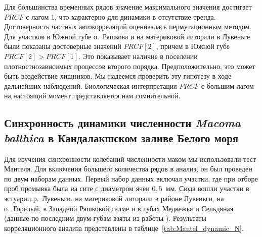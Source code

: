Для большинства временных рядов значение максимального значения достигает $PRCF$ с лагом 1, что характерно для динамики в отсутствие тренда. 
Достоверность частных автокорреляций оценивалась пермутационным методом.
Для участков в Южной губе о.~Ряшкова и на материковой литорали в Лувеньге были показаны достоверные значений $PRCF[2]$, причем в Южной губе $PRCF[2] > PRCF[1]$. 
Это показывает наличие в поселении плотностнозависимых процессов второго порядка.
Предположительно, это может быть воздействие хищников.
Мы надеемся проверить эту гипотезу в ходе дальнейших наблюдений.
Биологическая интерпретация $PRCF$ с большим лагом на настоящий момент представляется нам сомнительной.

		\subsection{Синхронность динамики численности {\it Macoma balthica} в Кандалакшском заливе Белого моря}
Для изучения синхронности колебаний численности маком мы использовали тест Мантеля.
Для включения большего количества рядов в анализ, он был проведен по двум наборам данных.
Первый набор данных включал участки, где при отборе проб промывка была на сите с диаметром ячеи $0,5$~мм. 
Сюда вошли участки в эстуарии р.~Лувеньги, на материковой литорали в районе Лувеньги, на о.~Горелый, в Западной Ряшковой салме и в губах Медвежья и Сельдяная (данные по последним двум губам взяты из работы \cite{Varfolomeeva_Naumov_2013}).
Результаты корреляционного анализа представлены в таблице~\ref{tab:Mantel_dynamic_N}.

